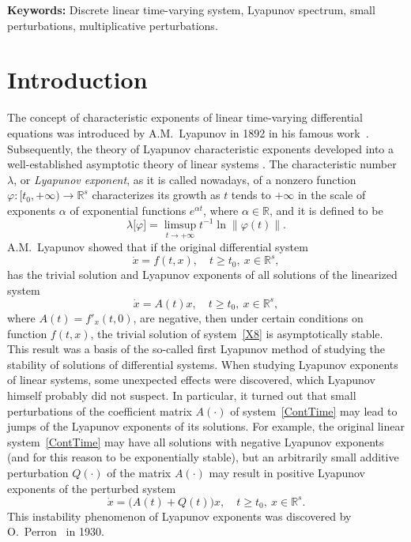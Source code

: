 \documentclass[11pt]{article}
\begin{document}
\medskip

{\bf Keywords:} Discrete linear time-varying system, Lyapunov spectrum, small perturbations, multiplicative perturbations.


\section{Introduction}

The concept of characteristic exponents of linear
time-varying differential equations was introduced by A.M.~Lyapunov in 1892
in his famous work~\cite{Lyapunov}. Subsequently, the theory of Lyapunov
characteristic exponents 
developed
into a well-established asymptotic
theory of linear systems \cite{Adrianova,Barreira,BVGN,Izobov,Izobovk}. The
characteristic number $\lambda$, 
or \emph{Lyapunov exponent}, as it is called nowadays, of a
nonzero function $\varphi \colon \lbrack t_{0},+\infty )\to \mathbb{R}^{s}$ characterizes its growth 
as $t$ tends to  $+\infty $
 in the scale of
exponents $\alpha $ of exponential functions $e^{\alpha t}$, where $\alpha \in\mathbb{R}$, 
and it is defined to be
\begin{equation*}
\lambda \lbrack \varphi ]=\limsup_{t\to +\infty }t^{-1}\ln \|
\varphi (t)\| .
\end{equation*}%
A.M.~Lyapunov showed that if the original differential system%
\begin{equation}
\dot{x}=f(t,x),\quad t\ge t_{0},~x\in \mathbb{R}^{s},  
\label{X8}
\end{equation}%
has the trivial solution and Lyapunov exponents of all solutions of 
the linearized system%
\begin{equation}
\dot{x}=A(t)x,\quad t\ge t_{0},~x\in \mathbb{R}^{s},  
\label{ContTime}
\end{equation}%
where $A(t)=f'_{x}(t,0)$,
are negative, then under certain conditions on function $f(t,x)$, the trivial
solution of system~\eqref{X8} is asymptotically stable. This result was a
basis of the so-called first Lyapunov method of studying 
the stability of solutions of differential systems.
 When studying Lyapunov exponents of linear
systems, some unexpected effects were discovered, which
Lyapunov himself probably did not suspect.
 In particular, it turned out that small
perturbations of the coefficient matrix $A(\cdot )$ of system~\eqref{ContTime} 
may lead to jumps of the Lyapunov exponents of its
solutions. For example, the original linear system~\eqref{ContTime} may have
all solutions with negative Lyapunov exponents (and for this reason to be
exponentially stable), but an arbitrarily small additive perturbation 
$Q(\cdot) $ of the matrix $A(\cdot )$ 
may result in positive Lyapunov exponents of the perturbed system
\begin{equation}
\dot{x}=\bigl(A(t)+Q(t)\bigr)x,\quad t\ge t_{0},~x\in \mathbb{R}^{s}.
\label{perturbed}
\end{equation}%
 This instability phenomenon of 
Lyapunov exponents was discovered by O.~Perron~\cite{Perron} in 1930. 
\end{document}
